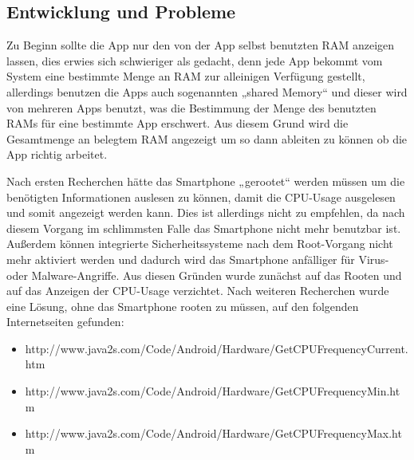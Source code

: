 \documentclass[12pt, onecolumn,notitlepage]{scrartcl}
\begin{document}
\subsection{Entwicklung und Probleme}
Zu Beginn sollte die App nur den von der App selbst benutzten RAM anzeigen lassen, dies erwies sich schwieriger als gedacht, denn jede App bekommt vom System eine bestimmte Menge an RAM zur alleinigen Verfügung gestellt, allerdings benutzen die Apps auch sogenannten „shared Memory“ und dieser wird von mehreren Apps benutzt, was die Bestimmung der Menge des benutzten RAMs für eine bestimmte App erschwert. Aus diesem Grund wird die Gesamtmenge an belegtem RAM angezeigt um so dann ableiten zu können ob die App richtig arbeitet. \par
Nach ersten Recherchen hätte das Smartphone „gerootet“ werden müssen um die benötigten Informationen auslesen zu können, damit die CPU-Usage ausgelesen und somit angezeigt werden kann. Dies ist allerdings nicht zu empfehlen, da nach diesem Vorgang im schlimmsten Falle das Smartphone nicht mehr benutzbar ist. Außerdem können integrierte Sicherheitssysteme nach dem Root-Vorgang nicht mehr aktiviert werden und dadurch wird das Smartphone anfälliger für Virus- oder Malware-Angriffe. Aus diesen Gründen wurde zunächst auf das Rooten und auf das Anzeigen der CPU-Usage verzichtet. Nach weiteren Recherchen wurde eine Lösung, ohne das Smartphone rooten zu müssen, auf den folgenden Internetseiten gefunden:
\begin{itemize}
	\itemsep0pt
	\item http://www.java2s.com/Code/Android/Hardware/GetCPUFrequencyCurrent.htm
	\item http://www.java2s.com/Code/Android/Hardware/GetCPUFrequencyMin.htm
	\item http://www.java2s.com/Code/Android/Hardware/GetCPUFrequencyMax.htm 
\end{itemize}
\end{document}
